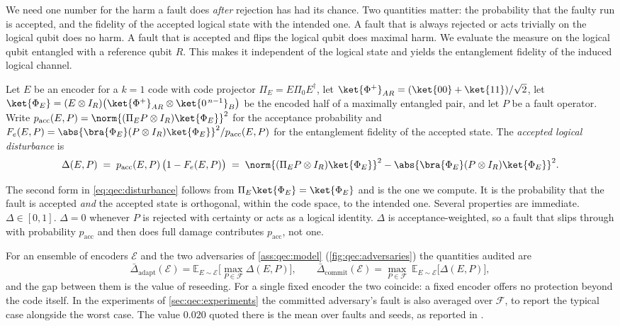 We need one number for the harm a fault does \emph{after} rejection has had its chance. Two quantities matter: the probability that the faulty run is accepted, and the fidelity of the accepted logical state with the intended one. A fault that is always rejected or acts trivially on the logical qubit does no harm. A fault that is accepted and flips the logical qubit does maximal harm. We evaluate the measure on the logical qubit entangled with a reference qubit $R$. This makes it independent of the logical state and yields the entanglement fidelity of the induced logical channel.

\begin{definition}\label{def:qec:disturbance}
Let $E$ be an encoder for a $k=1$ code with code projector $\Pi_E=E\Pi_0E^{\dagger}$, let $\ket{\Phi^{+}}_{AR}=(\ket{00}+\ket{11})/\sqrt2$, let $\ket{\Phi_E}=(E\otimes I_R)\big(\ket{\Phi^{+}}_{AR}\otimes\ket{0^{\,n-1}}_B\big)$ be the encoded half of a maximally entangled pair, and let $P$ be a fault operator. Write $p_{\mathrm{acc}}(E,P)=\norm{(\Pi_E P\otimes I_R)\ket{\Phi_E}}^{2}$ for the acceptance probability and $F_e(E,P)=\abs{\bra{\Phi_E}(P\otimes I_R)\ket{\Phi_E}}^{2}/p_{\mathrm{acc}}(E,P)$ for the entanglement fidelity of the accepted state. The \emph{accepted logical disturbance} is
\begin{equation}\label{eq:qec:disturbance}
  \Delta(E,P)\;=\;p_{\mathrm{acc}}(E,P)\,\big(1-F_e(E,P)\big)
  \;=\;\norm{(\Pi_E P\otimes I_R)\ket{\Phi_E}}^{2}-\abs{\bra{\Phi_E}(P\otimes I_R)\ket{\Phi_E}}^{2}.
\end{equation}
\end{definition}

The second form in \cref{eq:qec:disturbance} follows from $\Pi_E\ket{\Phi_E}=\ket{\Phi_E}$ and is the one we compute. It is the probability that the fault is accepted \emph{and} the accepted state is orthogonal, within the code space, to the intended one. Several properties are immediate. $\Delta\in[0,1]$. $\Delta=0$ whenever $P$ is rejected with certainty or acts as a logical identity. $\Delta$ is acceptance-weighted, so a fault that slips through with probability $p_{\mathrm{acc}}$ and then does full damage contributes $p_{\mathrm{acc}}$, not one.

For an ensemble of encoders $\mathcal{E}$ and the two adversaries of \cref{ass:qec:model} (\cref{fig:qec:adversaries}) the quantities audited are
\begin{equation}\label{eq:qec:adversaries}
  \bar\Delta_{\mathrm{adapt}}(\mathcal{E})=\mathbb{E}_{E\sim\mathcal{E}}\Big[\max_{P\in\mathcal{F}}\Delta(E,P)\Big],\qquad
  \bar\Delta_{\mathrm{commit}}(\mathcal{E})=\max_{P\in\mathcal{F}}\ \mathbb{E}_{E\sim\mathcal{E}}\big[\Delta(E,P)\big],
\end{equation}
and the gap between them is the value of reseeding. For a single fixed encoder the two coincide: a fixed encoder offers no protection beyond the code itself. In the experiments of \cref{sec:qec:experiments} the committed adversary's fault is also averaged over $\mathcal{F}$, to report the typical case alongside the worst case. The value $0.020$ quoted there is the mean over faults and seeds, as reported in \cite{guo2026qecaudit}.

